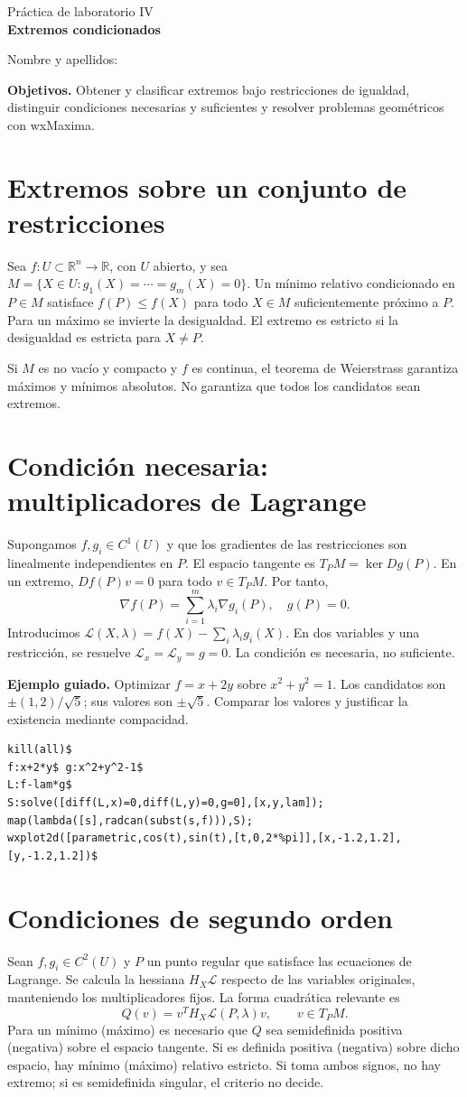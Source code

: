 \documentclass[12pt,a4paper]{article}
\begin{document}
\begin{center}{\large Práctica de laboratorio IV}\\[5pt]{\LARGE\bfseries\color{azul} Extremos condicionados}\end{center}
\noindent Nombre y apellidos: \hrulefill\par\medskip
\noindent\textbf{Objetivos.} Obtener y clasificar extremos bajo restricciones de igualdad, distinguir condiciones necesarias y suficientes y resolver problemas geométricos con wxMaxima.
\section{Extremos sobre un conjunto de restricciones}
Sea $f:U\subset\mathbb R^n\to\mathbb R$, con $U$ abierto, y sea $M=\{X\in U:g_1(X)=\cdots=g_m(X)=0\}$. Un mínimo relativo condicionado en $P\in M$ satisface $f(P)\le f(X)$ para todo $X\in M$ suficientemente próximo a $P$. Para un máximo se invierte la desigualdad. El extremo es estricto si la desigualdad es estricta para $X\ne P$.

Si $M$ es no vacío y compacto y $f$ es continua, el teorema de Weierstrass garantiza máximos y mínimos absolutos. No garantiza que todos los candidatos sean extremos.
\section{Condición necesaria: multiplicadores de Lagrange}
Supongamos $f,g_i\in C^1(U)$ y que los gradientes de las restricciones son linealmente independientes en $P$. El espacio tangente es $T_PM=\ker Dg(P)$. En un extremo, $Df(P)v=0$ para todo $v\in T_PM$. Por tanto,
\[\boxed{\nabla f(P)=\sum_{i=1}^m\lambda_i\nabla g_i(P),\quad g(P)=0.}\]
Introducimos $\mathcal L(X,\lambda)=f(X)-\sum_i\lambda_i g_i(X)$. En dos variables y una restricción, se resuelve $\mathcal L_x=\mathcal L_y=g=0$. La condición es necesaria, no suficiente.

\textbf{Ejemplo guiado.} Optimizar $f=x+2y$ sobre $x^2+y^2=1$. Los candidatos son $\pm(1,2)/\sqrt5$; sus valores son $\pm\sqrt5$. Comparar los valores y justificar la existencia mediante compacidad.
\begin{lstlisting}
kill(all)$
f:x+2*y$ g:x^2+y^2-1$
L:f-lam*g$
S:solve([diff(L,x)=0,diff(L,y)=0,g=0],[x,y,lam]);
map(lambda([s],radcan(subst(s,f))),S);
wxplot2d([parametric,cos(t),sin(t),[t,0,2*%pi]],[x,-1.2,1.2],[y,-1.2,1.2])$
\end{lstlisting}
\section{Condiciones de segundo orden}
Sean $f,g_i\in C^2(U)$ y $P$ un punto regular que satisface las ecuaciones de Lagrange. Se calcula la hessiana $H_X\mathcal L$ respecto de las variables originales, manteniendo los multiplicadores fijos. La forma cuadrática relevante es
\[Q(v)=v^TH_X\mathcal L(P,\lambda)v,\qquad v\in T_PM.\]
Para un mínimo (máximo) es necesario que $Q$ sea semidefinida positiva (negativa) sobre el espacio tangente. Si es definida positiva (negativa) sobre dicho espacio, hay mínimo (máximo) relativo estricto. Si toma ambos signos, no hay extremo; si es semidefinida singular, el criterio no decide.
\end{document}
